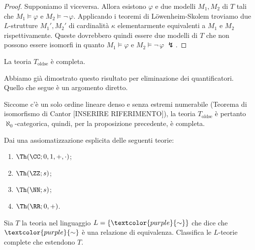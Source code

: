 \begin{proof}
    Supponiamo il viceversa. Allora esistono $\varphi$ e due modelli $M_1, M_2$ di $T$ tali che $M_1 \models \varphi$ e $M_2 \models \neg \, \varphi$.
    Applicando i teoremi di Löwenheim-Skolem troviamo due $L$-strutture $M_1', M_2'$ di cardinalità $\kappa$ elementarmente equivalenti a $M_1$ e $M_2$ rispettivamente.
    Queste dovrebbero quindi essere due modelli di $T$ che non possono essere isomorfi in quanto $M_1 \models \varphi$ e $M_2 \models \neg \, \varphi \; \lightning$.
\end{proof}

\begin{exercise}
    La teoria $T_{\text{oldse}}$ è completa.
\end{exercise}

\begin{note}
    Abbiamo già dimostrato questo risultato per eliminazione dei quantificatori. Quello che segue è un argomento diretto.
\end{note}

\begin{soln}
    Siccome c'è un solo ordine lineare denso e senza estremi numerabile (Teorema di isomorfismo di Cantor [INSERIRE RIFERIMENTO]),
    la teoria $T_{\text{oldse}}$ è pertanto $\aleph_0$-categorica, quindi, per la proposizione precedente, è completa.
\end{soln}

\begin{exercise}
    Dai una assiomatizzazione esplicita delle seguenti teorie:
    \begin{enumerate}
        \item $\Th(\CC;0,1,+,\cdot)$;
        \item $\Th(\ZZ;s)$;
        \item $\Th(\NN;s)$;
        \item $\Th(\RR;0,+)$.
    \end{enumerate}
\end{exercise}

\begin{exercise}
    Sia $T$ la teoria nel linguaggio $L = \{\textcolor{purple}{\sim}\}$ che dice che $\textcolor{purple}{\sim}$ è una relazione di equivalenza.
    Classifica le $L$-teorie complete che estendono $T$.
\end{exercise}